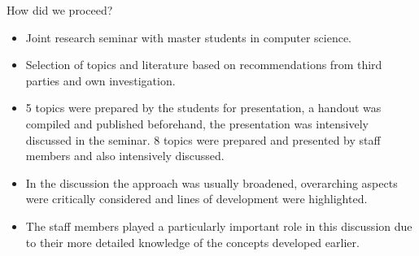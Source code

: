 \documentclass{beamer}
\begin{document}
\begin{frame}{How did we proceed?} 
\begin{itemize}
\item Joint research seminar with master students in computer science.
\item Selection of topics and literature based on recommendations from third
  parties and own investigation.
\item 5 topics were prepared by the students for presentation, a handout was
  compiled and published beforehand, the presentation was intensively
  discussed in the seminar. 8 topics were prepared and presented by staff
  members and also intensively discussed.
\item In the discussion the approach was usually broadened, overarching
  aspects were critically considered and lines of development were
  highlighted.
\item The staff members played a particularly important role in this
  discussion due to their more detailed knowledge of the concepts developed
  earlier.
\end{itemize}
\end{frame}
\end{document}
